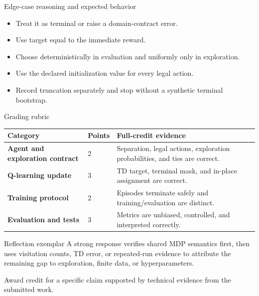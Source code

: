 \documentclass[aspectratio=169,11pt]{beamer}
\begin{document}
\begin{frame}{Edge-case reasoning and expected behavior}
\small
\begin{itemize}
  \item Treat it as terminal or raise a domain-contract error.
  \item Use target equal to the immediate reward.
  \item Choose deterministically in evaluation and uniformly only in exploration.
  \item Use the declared initialization value for every legal action.
  \item Record truncation separately and stop without a synthetic terminal bootstrap.
\end{itemize}
\end{frame}

\begin{frame}{Grading rubric}
\scriptsize
\begin{tabularx}{\textwidth}{>{\bfseries}p{} p{} X}
\toprule
Category & Points & Full-credit evidence \\
\midrule
Agent and exploration contract & 2 & Separation, legal actions, exploration probabilities, and ties are correct. \\
Q-learning update & 3 & TD target, terminal mask, and in-place assignment are correct. \\
Training protocol & 2 & Episodes terminate safely and training/evaluation are distinct. \\
Evaluation and tests & 3 & Metrics are unbiased, controlled, and interpreted correctly. \\
\bottomrule
\end{tabularx}
\end{frame}

\begin{frame}{Reflection exemplar}
\small
\answerlabel A strong response verifies shared MDP semantics first, then uses visitation counts, TD error, or repeated-run evidence to attribute the remaining gap to exploration, finite data, or hyperparameters.

\vspace{0.25cm}
\gradinglabel Award credit for a specific claim supported by technical evidence from the submitted work.
\end{frame}
\end{document}
